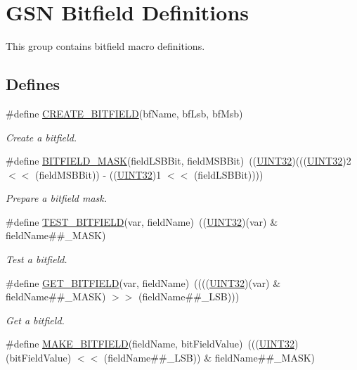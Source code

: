 \hypertarget{a00657}{
\section{GSN Bitfield Definitions}
\label{a00657}
}


This group contains bitfield macro definitions.  


\subsection*{Defines}
\begin{DoxyCompactItemize}
\item 
\#define \hyperlink{a00657_ga4af6407b36a81973e93a80026461312d}{CREATE\_\-BITFIELD}(bfName, bfLsb, bfMsb)
\begin{DoxyCompactList}\small\item\em Create a bitfield. \end{DoxyCompactList}\item 
\#define \hyperlink{a00657_ga330112fe57abc76abf484fedd191ca29}{BITFIELD\_\-MASK}(fieldLSBBit, fieldMSBBit)~((\hyperlink{a00660_gae1e6edbbc26d6fbc71a90190d0266018}{UINT32})(((\hyperlink{a00660_gae1e6edbbc26d6fbc71a90190d0266018}{UINT32})2 $<$$<$ (fieldMSBBit)) -\/ ((\hyperlink{a00660_gae1e6edbbc26d6fbc71a90190d0266018}{UINT32})1 $<$$<$ (fieldLSBBit))))
\begin{DoxyCompactList}\small\item\em Prepare a bitfield mask. \end{DoxyCompactList}\item 
\#define \hyperlink{a00657_ga99ab04466c2041af684f24ec71596969}{TEST\_\-BITFIELD}(var, fieldName)~((\hyperlink{a00660_gae1e6edbbc26d6fbc71a90190d0266018}{UINT32})(var) \& fieldName\#\#\_\-MASK)
\begin{DoxyCompactList}\small\item\em Test a bitfield. \end{DoxyCompactList}\item 
\#define \hyperlink{a00657_ga3e5cdd0d8d2d0a80286bfe31fe379530}{GET\_\-BITFIELD}(var, fieldName)~((((\hyperlink{a00660_gae1e6edbbc26d6fbc71a90190d0266018}{UINT32})(var) \& fieldName\#\#\_\-MASK) $>$$>$ (fieldName\#\#\_\-LSB)))
\begin{DoxyCompactList}\small\item\em Get a bitfield. \end{DoxyCompactList}\item 
\#define \hyperlink{a00657_ga32ad62c1b9d831dbd3c0cb56d39457fd}{MAKE\_\-BITFIELD}(fieldName, bitFieldValue)~(((\hyperlink{a00660_gae1e6edbbc26d6fbc71a90190d0266018}{UINT32})(bitFieldValue) $<$$<$ (fieldName\#\#\_\-LSB)) \& fieldName\#\#\_\-MASK)

\end{DoxyCompactItemize}
